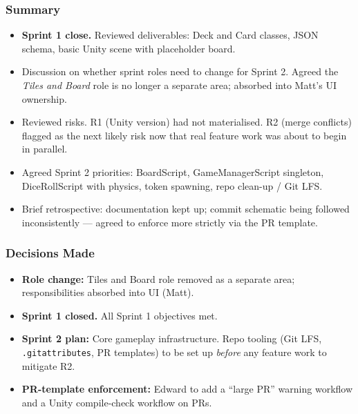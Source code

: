 \subsubsection*{Summary}
\begin{itemize}
    \item \textbf{Sprint 1 close.} Reviewed deliverables: Deck and Card classes, JSON schema, basic Unity scene with placeholder board.
    \item Discussion on whether sprint roles need to change for Sprint 2. Agreed the \textit{Tiles and Board} role is no longer a separate area; absorbed into Matt's UI ownership.
    \item Reviewed risks. R1 (Unity version) had not materialised. R2 (merge conflicts) flagged as the next likely risk now that real feature work was about to begin in parallel.
    \item Agreed Sprint 2 priorities: BoardScript, GameManagerScript singleton, DiceRollScript with physics, token spawning, repo clean-up / Git LFS.
    \item Brief retrospective: documentation kept up; commit schematic being followed inconsistently --- agreed to enforce more strictly via the PR template.
\end{itemize}

\subsubsection*{Decisions Made}
\begin{itemize}
    \item \textbf{Role change:} Tiles and Board role removed as a separate area; responsibilities absorbed into UI (Matt).
    \item \textbf{Sprint 1 closed.} All Sprint 1 objectives met.
    \item \textbf{Sprint 2 plan:} Core gameplay infrastructure. Repo tooling (Git LFS, \texttt{.gitattributes}, PR templates) to be set up \textit{before} any feature work to mitigate R2.
    \item \textbf{PR-template enforcement:} Edward to add a ``large PR'' warning workflow and a Unity compile-check workflow on PRs.
\end{itemize}


